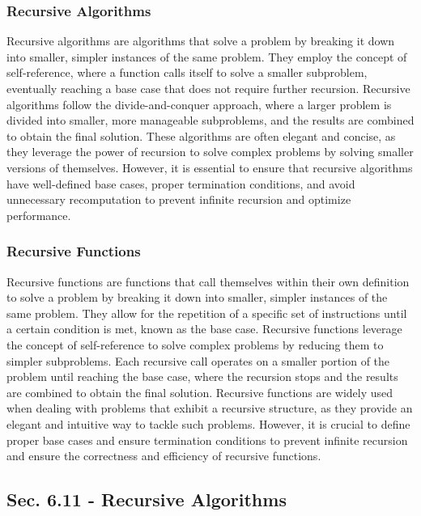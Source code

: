 \subsubsection{Recursive Algorithms}

Recursive algorithms are algorithms that solve a problem by breaking it down into smaller, simpler instances of the same problem. They employ the concept of self-reference, where a function calls itself to solve a smaller subproblem, eventually reaching a base case that does not require further recursion. Recursive algorithms follow the divide-and-conquer 
approach, where a larger problem is divided into smaller, more manageable subproblems, and the results are combined to obtain the final solution. These algorithms are often elegant and concise, as they leverage the power of recursion to solve complex problems by solving smaller versions of themselves. However, it is essential to ensure that recursive algorithms 
have well-defined base cases, proper termination conditions, and avoid unnecessary recomputation to prevent infinite recursion and optimize performance.

\subsubsection{Recursive Functions}

Recursive functions are functions that call themselves within their own definition to solve a problem by breaking it down into smaller, simpler instances of the same problem. They allow for the repetition of a specific set of instructions until a certain condition is met, known as the base case. Recursive functions leverage the concept of self-reference to solve 
complex problems by reducing them to simpler subproblems. Each recursive call operates on a smaller portion of the problem until reaching the base case, where the recursion stops and the results are combined to obtain the final solution. Recursive functions are widely used when dealing with problems that exhibit a recursive structure, as they provide an elegant 
and intuitive way to tackle such problems. However, it is crucial to define proper base cases and ensure termination conditions to prevent infinite recursion and ensure the correctness and efficiency of recursive functions.

\subsection*{Sec. 6.11 - Recursive Algorithms}

